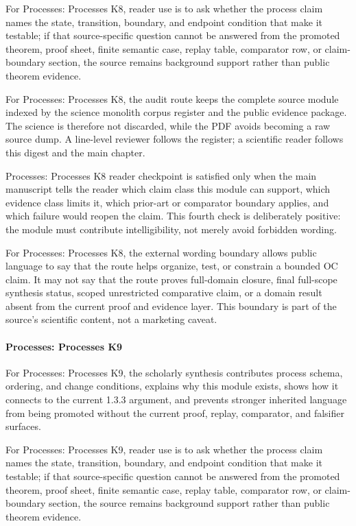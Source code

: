 For Processes: Processes K8, reader use is to ask whether the process claim names the state, transition, boundary, and endpoint condition that make it testable; if that source-specific question cannot be answered from the promoted theorem, proof sheet, finite semantic case, replay table, comparator row, or claim-boundary section, the source remains background support rather than public theorem evidence.


For Processes: Processes K8, the audit route keeps the complete source module indexed by the science monolith corpus register and the public evidence package. The science is therefore not discarded, while the PDF avoids becoming a raw source dump. A line-level reviewer follows the register; a scientific reader follows this digest and the main chapter.


Processes: Processes K8 reader checkpoint is satisfied only when the main manuscript tells the reader which claim class this module can support, which evidence class limits it, which prior-art or comparator boundary applies, and which failure would reopen the claim. This fourth check is deliberately positive: the module must contribute intelligibility, not merely avoid forbidden wording.


For Processes: Processes K8, the external wording boundary allows public language to say that the route helps organize, test, or constrain a bounded OC claim. It may not say that the route proves full-domain closure, final full-scope synthesis status, scoped unrestricted comparative claim, or a domain result absent from the current proof and evidence layer. This boundary is part of the source's scientific content, not a marketing caveat.


\paragraph{Processes: Processes K9}

For Processes: Processes K9, the scholarly synthesis contributes process schema, ordering, and change conditions, explains why this module exists, shows how it connects to the current 1.3.3 argument, and prevents stronger inherited language from being promoted without the current proof, replay, comparator, and falsifier surfaces.


For Processes: Processes K9, reader use is to ask whether the process claim names the state, transition, boundary, and endpoint condition that make it testable; if that source-specific question cannot be answered from the promoted theorem, proof sheet, finite semantic case, replay table, comparator row, or claim-boundary section, the source remains background support rather than public theorem evidence.


